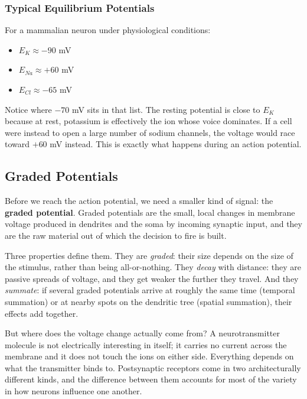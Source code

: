 \documentclass[11pt]{article}
\begin{document}
\subsubsection{Typical Equilibrium Potentials}

For a mammalian neuron under physiological conditions:

\begin{itemize}
    \item $E_K \approx -90$ mV
    \item $E_{Na} \approx +60$ mV
    \item $E_{Cl} \approx -65$ mV
\end{itemize}

Notice where $-70$ mV sits in that list. The resting potential is close to $E_K$ because at rest, potassium is effectively the ion whose voice dominates. If a cell were instead to open a large number of sodium channels, the voltage would race toward $+60$ mV instead. This is exactly what happens during an action potential.

\subsection{Graded Potentials}

Before we reach the action potential, we need a smaller kind of signal: the \textbf{graded potential}. Graded potentials are the small, local changes in membrane voltage produced in dendrites and the soma by incoming synaptic input, and they are the raw material out of which the decision to fire is built.

Three properties define them. They are \textit{graded}: their size depends on the size of the stimulus, rather than being all-or-nothing. They \textit{decay} with distance: they are passive spreads of voltage, and they get weaker the further they travel. And they \textit{summate}: if several graded potentials arrive at roughly the same time (temporal summation) or at nearby spots on the dendritic tree (spatial summation), their effects add together.

But where does the voltage change actually come from? A neurotransmitter molecule is not electrically interesting in itself; it carries no current across the membrane and it does not touch the ions on either side. Everything depends on what the transmitter binds to. Postsynaptic receptors come in two architecturally different kinds, and the difference between them accounts for most of the variety in how neurons influence one another.
\end{document}

